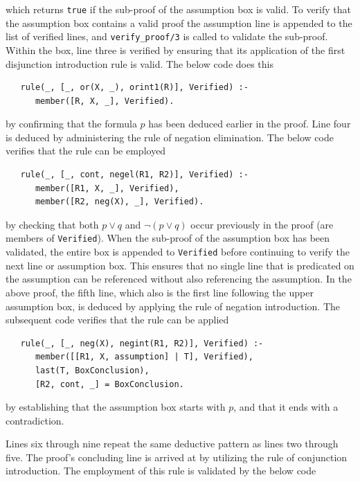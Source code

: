 \documentclass[a4paper, 11pt]{article}
\begin{document}
   which returns \texttt{true} if the sub-proof of the
   assumption box is valid. To verify that the
   assumption box contains a valid proof the
   assumption line is appended to the list of
   verified lines, and \texttt{verify\_proof/3} is
   called to validate the sub-proof. Within the box,
   line three is verified by ensuring that its
   application of the first disjunction introduction
   rule is valid. The below code does this

\begin{verbatim}
   rule(_, [_, or(X, _), orint1(R)], Verified) :-
      member([R, X, _], Verified).
\end{verbatim}

   by confirming that the formula $p$ has been
   deduced earlier in the proof. Line four is deduced
   by administering the rule of negation elimination.
   The below code verifies that the rule can be
   employed

\begin{verbatim}
   rule(_, [_, cont, negel(R1, R2)], Verified) :-
      member([R1, X, _], Verified),
      member([R2, neg(X), _], Verified).
\end{verbatim}

   by checking that both $p \vee q$ and 
   $\neg(p \vee q)$ occur previously in the proof
   (are members of \texttt{Verified}). When the
   sub-proof of the assumption box has been
   validated, the entire box is appended to
   \texttt{Verified} before continuing to verify the
   next line or assumption box. This ensures that no
   single line that is predicated on the assumption
   can be referenced without also referencing the
   assumption. In the above proof, the fifth line, 
   which also is the first line following the
   upper assumption box, is deduced by applying the
   rule of negation introduction. The subsequent code
   verifies that the rule can be applied

\begin{verbatim}
   rule(_, [_, neg(X), negint(R1, R2)], Verified) :-
      member([[R1, X, assumption] | T], Verified),
      last(T, BoxConclusion),
      [R2, cont, _] = BoxConclusion.
\end{verbatim}

   by establishing that the assumption box starts
   with $p$, and that it ends with a contradiction.
   \bigbreak

   Lines six through nine repeat the 
   same deductive pattern as lines two through five.
   The proof's concluding line is arrived at by
   utilizing the rule of conjunction introduction.
   The employment of this rule is validated by the
   below code
\end{document}
